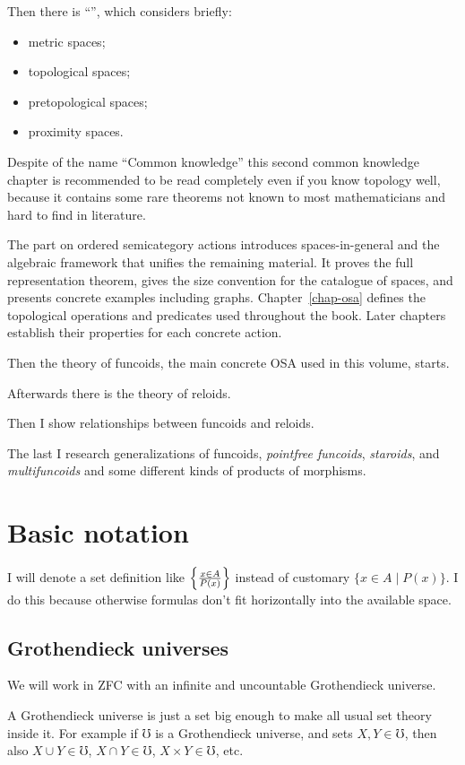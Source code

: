 Then there is ``'', which considers briefly:
\begin{itemize}
\item metric spaces;
\item topological spaces;
\item pretopological spaces;
\item proximity spaces.
\end{itemize}
Despite of the name ``Common knowledge'' this second common knowledge
chapter is recommended to be read completely even if you know topology
well, because it contains some rare theorems not known to most mathematicians
and hard to find in literature.

The part on ordered semicategory actions introduces spaces-in-general and
the algebraic framework that unifies the remaining material. It proves
the full representation theorem, gives the size convention for the
catalogue of spaces, and presents concrete examples including graphs.
Chapter~\ref{chap-osa} defines the topological operations and
predicates used throughout the book. Later chapters establish their
properties for each concrete action.

Then the theory of funcoids, the main concrete OSA used in this volume,
starts.

Afterwards there is the theory of reloids.

Then I show relationships between funcoids and reloids.

The last I research generalizations of funcoids, \emph{pointfree funcoids},
\emph{staroids}, and \emph{multifuncoids} and some different kinds
of products of morphisms.


\section{Basic notation}

I will denote a set definition like $\left\{ \frac{x\in A}{P(x)}\right\}$ instead
of customary $\{x\in A\mid P(x)\}$. I do this because otherwise formulas
don't fit horizontally into the available space.


\subsection{Grothendieck universes}

We will work in ZFC with an infinite and uncountable Grothendieck
universe.

A Grothendieck universe is just a set big enough to make all usual
set theory inside it. For example if $\mho$ is a Grothendieck universe,
and sets $X,Y\in\mho$, then also $X\cup Y\in\mho$, $X\cap Y\in\mho$,
$X\times Y\in\mho$, etc.

